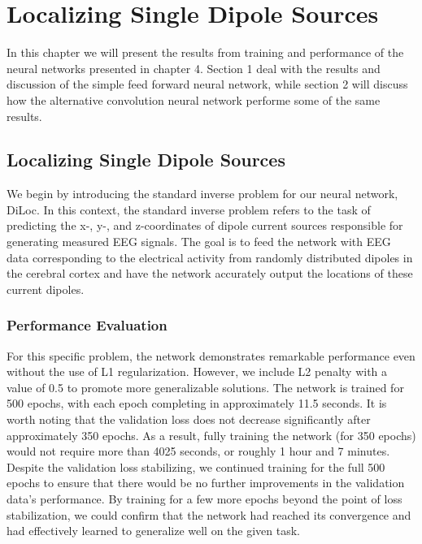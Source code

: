 \documentclass[a4paper, UKenglish, 11pt]{uiomaster}
\begin{document}
\chapter{Localizing Single Dipole Sources}

In this chapter we will present the results from training and performance of the neural networks presented in chapter 4. Section 1 deal with the results and discussion of the simple feed forward neural network, while section 2 will discuss how the alternative convolution neural network performe some of the same results.

\section{Localizing Single Dipole Sources}

We begin by introducing the standard inverse problem for our neural network, DiLoc. In this context, the standard inverse problem refers to the task of predicting the x-, y-, and z-coordinates of dipole current sources responsible for generating measured EEG signals. The goal is to feed the network with EEG data corresponding to the electrical activity from randomly distributed dipoles in the cerebral cortex and have the network accurately output the locations of these current dipoles.

\subsection{Performance Evaluation}
For this specific problem, the network demonstrates remarkable performance even without the use of L1 regularization. However, we include L2 penalty with a value of 0.5 to promote more generalizable solutions. The network is trained for 500 epochs, with each epoch completing in approximately 11.5 seconds. It is worth noting that the validation loss does not decrease significantly after approximately 350 epochs. As a result, fully training the network (for 350 epochs) would not require more than 4025 seconds, or roughly 1 hour and 7 minutes. Despite the validation loss stabilizing, we continued training for the full 500 epochs to ensure that there would be no further improvements in the validation data's performance. By training for a few more epochs beyond the point of loss stabilization, we could confirm that the network had reached its convergence and had effectively learned to generalize well on the given task.
\end{document}
